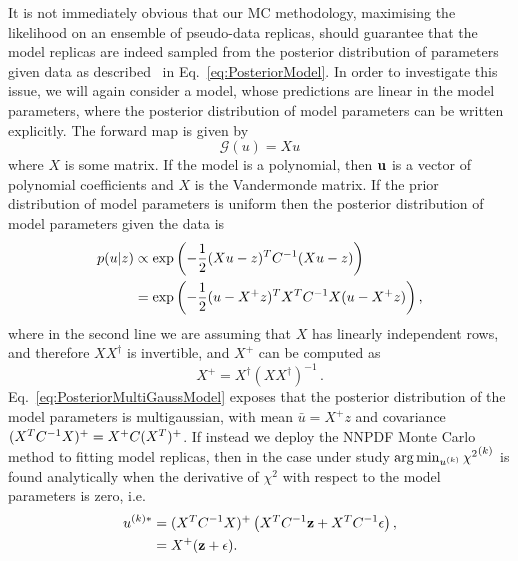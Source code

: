 It is not immediately obvious that our MC methodology, maximising the likelihood
on an ensemble of pseudo-data replicas, should guarantee that the model replicas
are indeed sampled from the posterior distribution of parameters given data as
described \eg\ in Eq.~\ref{eq:PosteriorModel}. In order to investigate this
issue, we will again consider a model, whose predictions are linear in the model
parameters, where the posterior distribution of model parameters can be written
explicitly. The forward map is given by
\begin{equation}
    \mathcal G(u) = X u
\end{equation}
where $X$ is some matrix. If the model is a polynomial, then $\mathbf{u}$ is a
vector of polynomial coefficients and $X$ is the Vandermonde matrix. If the
prior distribution of model parameters is uniform then the posterior
distribution of model parameters given the data is
\begin{equation}
    \label{eq:PosteriorMultiGaussModel}
    \begin{split}
        p(u | z) &\propto
        \exp \left( -\frac{1}{2} (Xu - z)^T C^{-1}_{} (Xu - z)\right) \\
        &= \exp \left( -\frac{1}{2} (u - X^+z)^T X^TC^{-1}_{}X (u - X^+z)\right),
    \end{split}
\end{equation}
where in the second line we are assuming that $X$ has linearly independent rows,
and therefore $X X^\dagger$ is invertible, and $X^+$ can be computed as 
\begin{equation}
    \label{eq:RightInverse}
    X^+ = X^\dagger \left(X X^\dagger\right)^{-1}\, .
\end{equation}
Eq.~\ref{eq:PosteriorMultiGaussModel} exposes that the posterior distribution of
the model parameters is multigaussian, with mean $\bar{u} = X^+z$ and covariance
$(X^TC^{-1}_{}X)^+ = X^+ C (X^T)^+$. If instead we deploy the NNPDF Monte
Carlo method to fitting model replicas, then in the case under study
$\arg\min_{u^{(k)}} {\chi^2}^{(k)}$ is found analytically when the derivative of
$\chi^2$ with respect to the model parameters is zero, i.e.
\begin{equation}
    \label{eq:MAPEstLinModel}
    \begin{split}
        u^{(k) *} &= (X^TC^{-1}_{}X)^{+}
        \left( X^T C^{-1}_{} \mathbf{z} + X^T C^{-1}_{} \mathbf{\epsilon} \right), \\
        &= X^+ (\mathbf{z} + \mathbf{\epsilon}).
    \end{split}
\end{equation}
